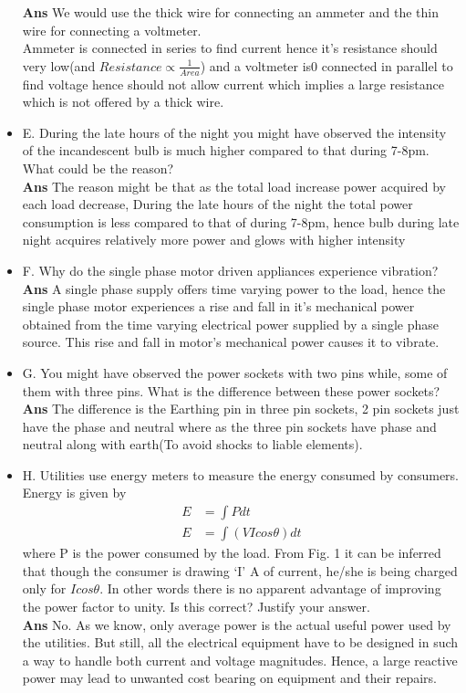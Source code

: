 \documentclass[12pt]{article}
\begin{document}
\begin{itemize}
      \textbf{Ans} We would use the thick wire for connecting an ammeter and the thin wire for connecting a voltmeter.\vspace{0.2cm}\\
      Ammeter is connected in series to find current hence it's resistance should very low(and $Resistance \propto \frac{1}{Area}$) and a voltmeter is0 connected in parallel to find voltage hence should not allow current which implies a large resistance which is not offered by a thick wire.
      \item E. During the late hours of the night you might have observed the intensity of the incandescent bulb is much higher compared to that during 7-8pm. What could be the reason?\vspace{0.2cm} \\
      \textbf{Ans} The reason might be that as the total load increase power acquired by each load decrease,  During the late hours of the night the total power consumption is less compared to that of during 7-8pm, hence bulb during late night acquires relatively more power and glows with higher intensity
      \item F. Why do the single phase motor driven appliances experience vibration? \vspace{0.2cm} \\
      \textbf{Ans} A single phase supply offers time varying power to the load, hence the single phase motor experiences a rise and fall in it's mechanical power obtained from the time varying electrical power supplied by a single phase source. This rise and fall in motor's mechanical power causes it to vibrate. 
      \item G. You might have observed the power sockets with two pins while, some of them with three pins. What is the difference between these power sockets?\vspace{0.2cm} \\
      \textbf{Ans} The difference is the Earthing pin in three pin sockets, 2 pin sockets just have the phase and neutral where as the three pin sockets have phase and neutral along with earth(To avoid shocks to liable elements).
      \item H. Utilities use energy meters to measure the energy consumed by consumers. Energy is given by
      \begin{align}
          E &= \int P dt \\
          E &= \int (VIcos\theta) dt
      \end{align}
      where P is the power consumed by the load. From Fig. 1 it can be inferred that though the consumer is drawing `I' A of current, he/she is being charged only for $I cos\theta$. In other words there is no apparent advantage of improving the power factor to unity. Is this correct? Justify your answer.\vspace{0.2cm} \\
      \textbf{Ans} No. As we know, only average power is the actual useful power used by the utilities. But still, all the electrical equipment have to be designed in such a way to handle both current and voltage magnitudes. Hence, a large reactive power may lead to unwanted cost bearing on equipment and their repairs. 
      

\end{itemize}
\end{document}
